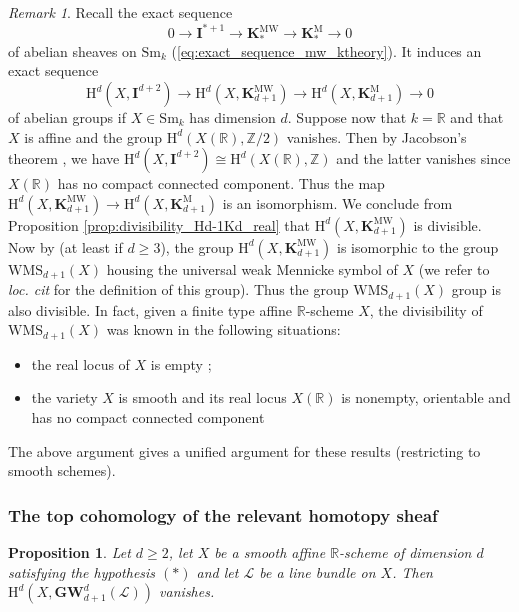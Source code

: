 \documentclass[11pt,leqno]{amsart}
\newcommand{\GW}{\mathbf{GW}}
\renewcommand{\1}{{\rm 1\hspace*{-0.4ex}%
\rule{0.1ex}{1.52ex}\hspace*{0.2ex}}}
\renewcommand{\Lc}{{\mathcal L}}
\newcommand{\Sm}{\mathrm{Sm}}
\newcommand{\Hr}{{\mathrm {H}}}
\newcommand{\<}[1]{{\langle}#1 {\rangle}}
\newcommand{\Ibf}{\mathbf{I}}
\newcommand{\Rb}{\mathbb{R}}
\newcommand{\Zb}{\mathbb{Z}}
\newcommand{\Kbf}{\mathbf{K}}
\newcommand{\Mr}{\mathrm{M}}
\newcommand{\MW}{\mathrm{MW}}
\theoremstyle{plain}
\newtheorem{prop}[thm]{Proposition}
\theoremstyle{definition}
\theoremstyle{remark}
\newtheorem{rem}[thm]{Remark}
\numberwithin{equation}{section}
\begin{document}
\begin{rem}
Recall the exact sequence \[0\rightarrow\Ibf^{*+1}\rightarrow\Kbf_*^\MW\rightarrow\Kbf_*^\Mr\rightarrow 0\] of abelian sheaves on $\Sm_k$ (\ref{eq:exact_sequence_mw_ktheory}). It induces an exact sequence \[\Hr^d(X,\Ibf^{d+2})\rightarrow\Hr^d(X,\Kbf_{d+1}^\MW)\rightarrow\Hr^d(X,\Kbf_{d+1}^\Mr)\rightarrow 0\] of abelian groups if $X\in\Sm_k$ has dimension $d$. Suppose now that $k=\Rb$ and that $X$ is affine and the group $\Hr^d(X(\Rb),\Zb/2)$ vanishes. Then by Jacobson's theorem \cite{jacobsonRealCohomologyPowers2017}, we have $\Hr^d(X,\Ibf^{d+2})\cong\Hr^d(X(\Rb),\Zb)$ and the latter vanishes since $X(\Rb)$ has no compact connected component. Thus the map $\Hr^d(X,\Kbf_{d+1}^\MW)\rightarrow\Hr^d(X,\Kbf_{d+1}^\Mr)$ is an isomorphism. We conclude from Proposition \ref{prop:divisibility_Hd-1Kd_real} that $\Hr^d(X,\Kbf_{d+1}^\MW)$ is divisible. Now by \cite[Theorem 4.9]{faselRemarksOrbitSets2010a} (at least if $d\geq 3$), the group $\Hr^d(X,\Kbf_{d+1}^\MW)$ is isomorphic to the group $\mathrm{WMS}_{d+1}(X)$ housing the universal weak Mennicke symbol of $X$ (we refer to \emph{loc. cit} for the definition of this group). Thus the group $\mathrm{WMS}_{d+1}(X)$ group is also divisible. In fact, given a finite type affine $\Rb$-scheme $X$, the divisibility of $\mathrm{WMS}_{d+1}(X)$ was known in the following situations:
\begin{itemize}
    \item the real locus of $X$ is empty \cite[Corollary 4.3]{banerjeeZeroCyclesMennicke2025};
    \item the variety $X$ is smooth and its real locus $X(\Rb)$ is nonempty, orientable and has no compact connected component \cite[Corollary 4.5, Theorem 4.6]{dasOrbitSpacesUnimodular2018}
\end{itemize}
The above argument gives a unified argument for these results (restricting \cite[Corollary 4.3]{banerjeeZeroCyclesMennicke2025} to smooth schemes).
\end{rem}

\subsubsection*{The top cohomology of the relevant homotopy sheaf} 

\begin{prop}\label{prop:vanishing_hd_GW_d+1_d}
Let $d\geq 2$, let $X$ be a smooth affine $\Rb$-scheme of dimension $d$ satisfying the hypothesis $(*)$ and let $\Lc$ be a line bundle on $X$. Then $\Hr^d(X,\GW_{d+1}^d(\Lc))$ vanishes.
\end{prop}
\end{document}
